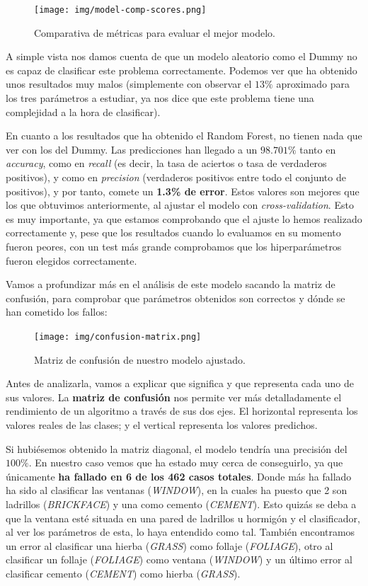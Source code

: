 \documentclass[11pt,a4paper]{article}
\begin{document}
\begin{figure}[H]
    \centering
    \texttt{[image: img/model-comp-scores.png]}
    \caption{Comparativa de métricas para evaluar el mejor modelo.}
    \label{fig:model-comp-scores}
\end{figure}

A simple vista nos damos cuenta de que un modelo aleatorio como el Dummy no es capaz de clasificar este problema correctamente. Podemos
ver que ha obtenido unos resultados muy malos (simplemente con observar el $13\%$ aproximado para los tres parámetros a estudiar, ya nos
dice que este problema tiene una complejidad a la hora de clasificar).

En cuanto a los resultados que ha obtenido el Random Forest, no tienen nada que ver con los del Dummy. Las predicciones han llegado a un
$98.701\%$ tanto en \textit{accuracy}, como en \textit{recall} (es decir, la tasa de aciertos o tasa de verdaderos positivos), y como en
\textit{precision} (verdaderos positivos entre todo el conjunto de positivos), y por tanto, comete un \textbf{1.3\% de error}. Estos
valores son mejores que los que obtuvimos anteriormente, al ajustar el modelo con \textit{cross-validation}. Esto es muy importante, ya
que estamos comprobando que el ajuste lo hemos realizado correctamente y, pese que los resultados cuando lo evaluamos en su momento fueron
peores, con un test más grande comprobamos que los hiperparámetros fueron elegidos correctamente.

Vamos a profundizar más en el análisis de este modelo sacando la matriz de confusión, para comprobar que parámetros obtenidos son
correctos y dónde se han cometido los fallos:

\begin{figure}[H]
    \centering
    \texttt{[image: img/confusion-matrix.png]}
    \caption{Matriz de confusión de nuestro modelo ajustado.}
    \label{fig:confusion-matrix}
\end{figure}

Antes de analizarla, vamos a explicar que significa y que representa cada uno de sus valores. La \textbf{matriz de confusión} nos permite ver más
detalladamente el rendimiento de un algoritmo a través de sus dos ejes. El horizontal representa los valores reales de las clases;
y el vertical representa los valores predichos.

Si hubiésemos obtenido la matriz diagonal, el modelo tendría una precisión del $100\%$. En nuestro caso vemos que ha estado muy cerca de
conseguirlo, ya que únicamente \textbf{ha fallado en 6 de los 462 casos totales}. Donde más ha fallado ha sido al clasificar las ventanas
(\textit{WINDOW}), en la cuales ha puesto que 2 son ladrillos (\textit{BRICKFACE}) y una como cemento (\textit{CEMENT}). Esto quizás se
deba a que la ventana esté situada en una pared de ladrillos u hormigón y el clasificador, al ver los parámetros de esta, lo haya
entendido como tal. También encontramos un error al clasificar una hierba (\textit{GRASS}) como follaje (\textit{FOLIAGE}), otro al
clasificar un follaje (\textit{FOLIAGE}) como ventana (\textit{WINDOW}) y un último error al clasificar cemento (\textit{CEMENT}) como
hierba (\textit{GRASS}).
\end{document}
